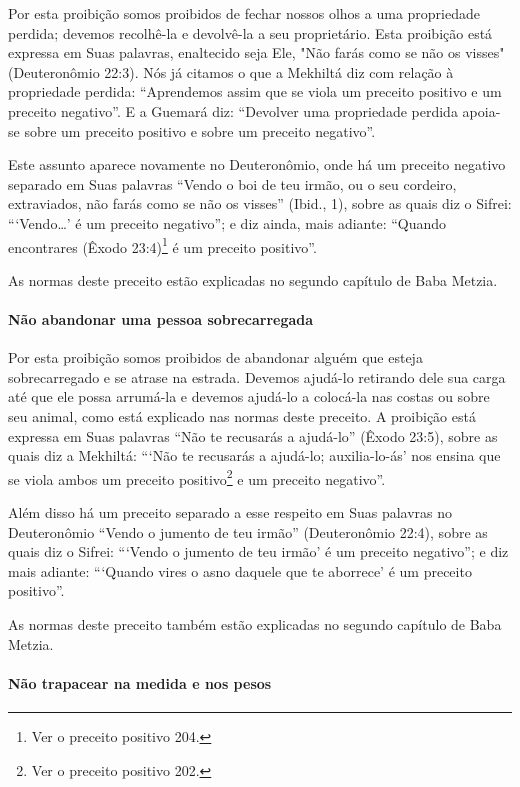 Por esta proibição somos proibidos de fechar nossos olhos a uma
propriedade perdida; devemos recolhê-la e devolvê-la a seu proprietário.
Esta proibição está expressa em Suas palavras, enaltecido seja Ele, "Não
farás como se não os visses" (Deuteronômio 22:3). Nós já citamos o que
a Mekhiltá diz com relação à propriedade perdida: ``Aprendemos assim que
se viola um preceito positivo e um preceito negativo''. E a Guemará diz:
``Devolver uma propriedade perdida apoia-se sobre um preceito positivo e
sobre um preceito negativo''.

Este assunto aparece novamente no Deuteronômio, onde há um preceito
negativo separado em Suas palavras ``Vendo o boi de teu irmão, ou o seu
cordeiro, extraviados, não farás como se não os visses'' (Ibid., 1),
sobre as quais diz o Sifrei: ```Vendo\ldots{}' é um preceito negativo''; e
diz ainda, mais adiante: ``Quando encontrares (Êxodo
23:4)\footnote{Ver o preceito positivo 204.} é um preceito positivo''.

As normas deste preceito estão explicadas no segundo capítulo de Baba Metzia.

\paragraph{Não abandonar uma pessoa sobrecarregada}

Por esta proibição somos proibidos de abandonar alguém que esteja
sobrecarregado e se atrase na estrada. Devemos ajudá-lo retirando dele
sua carga até que ele possa arrumá-la e devemos ajudá-lo a colocá-la nas
costas ou sobre seu animal, como está explicado nas normas deste
preceito. A proibição está expressa em Suas palavras ``Não te recusarás
a ajudá-lo'' (Êxodo 23:5), sobre as quais diz a Mekhiltá: ```Não te recusarás a ajudá-lo;
auxilia-lo-ás' nos ensina que se viola ambos um preceito
positivo\footnote{Ver o preceito positivo 202.} e um preceito negativo''.

Além disso há um preceito separado a esse respeito em Suas palavras no
Deuteronômio ``Vendo o jumento de teu irmão'' (Deuteronômio 22:4), sobre
as quais diz o Sifrei: ```Vendo o jumento de teu irmão' é um preceito
negativo''; e diz mais adiante: ```Quando vires o asno daquele que te
aborrece' é um preceito positivo''.

As normas deste preceito também estão explicadas no segundo capítulo de
Baba Metzia.

\paragraph{Não trapacear na medida e nos pesos}

